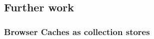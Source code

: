 \documentclass[11pt,a4paper,headsepline,twoside]{scrartcl}		%
\begin{document}









\subsection{Further work}
\label{sec:further-work}



\subsubsection{Browser Caches as collection stores}
\label{sec:browser-caches-as}
\end{document}
